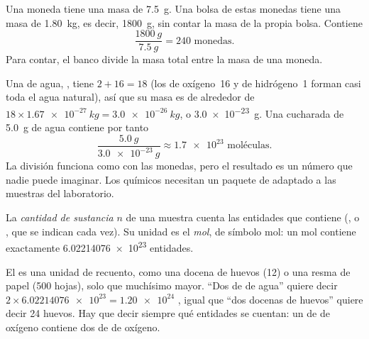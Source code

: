 \begin{example}\label{ex:g10:the-mole:coins}
Una moneda tiene una masa de \qty{7.5}{g}. Una bolsa de estas monedas
tiene una masa de \qty{1.80}{kg}, es decir, \qty{1800}{g}, sin contar la
masa de la propia bolsa. Contiene
\[
  \frac{\qty{1800}{g}}{\qty{7.5}{g}} = 240 \text{ monedas.}
\]
Para contar, el banco divide la masa total entre la masa de una moneda.
\end{example}

\begin{example}\label{ex:g10:the-mole:spoon}
Una  de agua, , tiene $2 + 16 = 18$  (los
 de oxígeno~16 y de hidrógeno~1 forman casi toda el agua natural),
así que su masa es de alrededor de
$18 \times \qty{1.67e-27}{kg} = \qty{3.0e-26}{kg}$, o
\qty{3.0e-23}{g}. Una cucharada de \qty{5.0}{g} de agua contiene por
tanto
\[
  \frac{\qty{5.0}{g}}{\qty{3.0e-23}{g}} \approx \num{1.7e23}
  \text{ moléculas.}
\]
La división funciona como con las monedas, pero el resultado es un
número que nadie puede imaginar. Los químicos necesitan un paquete de
 adaptado a las muestras del laboratorio.
\end{example}

\begin{definition}\label{def:g10:the-mole:amount}
La \emph{cantidad de sustancia} $n$ de una
muestra cuenta las entidades que contiene (,  o , que
se indican cada vez). Su unidad es el \emph{mol}, de símbolo
\si{mol}: un mol contiene exactamente \num{6.02214076e23} entidades.
\end{definition}

\begin{remark}\label{rem:g10:the-mole:dozen}
El  es una unidad de recuento, como una docena de huevos (12) o una
resma de papel (500 hojas), solo que muchísimo mayor. ``Dos  de
 de agua'' quiere decir
$2 \times \num{6.02214076e23} = \num{1.20e24}$ , igual que ``dos
docenas de huevos'' quiere decir 24 huevos. Hay que decir siempre qué
entidades se cuentan: un  de \emph{} de oxígeno 
contiene dos  de \emph{} de oxígeno.
\end{remark}

